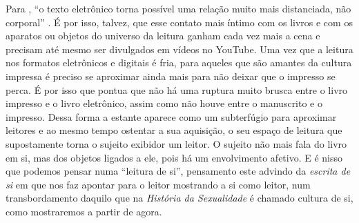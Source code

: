 Para \textcite{chartier1998aventura}, \enquote{o texto eletrônico torna possível uma relação muito mais distanciada, não corporal} \cite[p. 16]{chartier1998aventura}. É por isso, talvez, que esse contato mais íntimo com os livros e com os aparatos ou objetos do universo da leitura ganham cada vez mais a cena e precisam até mesmo ser divulgados em vídeos no YouTube. Uma vez que a leitura nos formatos eletrônicos e digitais é fria, para aqueles que são amantes da cultura impressa é preciso se aproximar ainda mais para não deixar que o impresso se perca. É por isso que \textcite{chartier1998aventura} pontua que não há uma ruptura muito brusca entre o livro impresso e o livro eletrônico, assim como não houve entre o manuscrito e o impresso. Dessa forma a estante aparece como um subterfúgio para aproximar leitores e ao mesmo tempo
ostentar a sua aquisição, o seu espaço de leitura que supostamente torna
o sujeito exibidor um leitor. O sujeito não mais fala do livro em si,
mas dos objetos ligados a ele, pois há um envolvimento afetivo. E é
nisso que podemos pensar numa \enquote{leitura de si}, pensamento este advindo
da \textit{escrita de si} em \textcite{foucault2006escrita} que nos faz apontar para o leitor mostrando a si como leitor, num transbordamento daquilo que na
\textit{História da Sexualidade} é chamado cultura de si, como mostraremos
a partir de agora.
